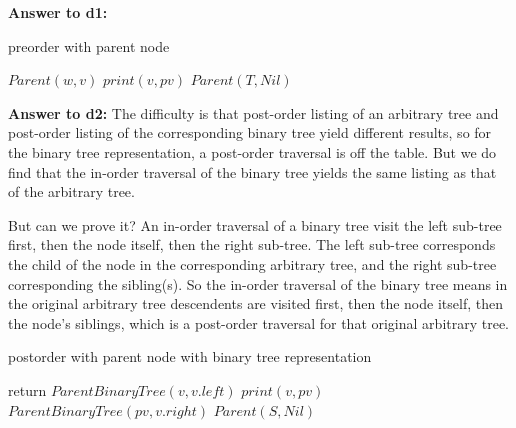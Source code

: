 \documentclass[a4paper,11pt]{article}
\theoremstyle{mytheor}
\begin{document}
\vspace{1.2in}

\noindent\textbf{Answer to d1:}
\begin{algorithm}[H]
\caption{preorder with parent node}\label{sec:TREEEVALUATION_2_19_D1}
\begin{algorithmic}[1]
    \State $Parent(w, v)$
  \EndFor
  $print(v, pv)$
\EndProcedure
\State
{}
  \State $Parent(T, Nil)$
\EndProcedure
\end{algorithmic}
\end{algorithm}

\vspace{1.2in}

\noindent\textbf{Answer to d2:} The difficulty is that post-order listing of an arbitrary tree and post-order listing of the corresponding binary tree yield different results, so for the binary tree representation, a post-order traversal is off the table. But we do find that the in-order traversal of the binary tree yields the same listing as that of the arbitrary tree.

But can we prove it? An in-order traversal of a binary tree visit the left sub-tree first, then the node itself, then the right sub-tree. The left sub-tree corresponds the child of the node in the corresponding arbitrary tree, and the right sub-tree corresponding the sibling(s). So the in-order traversal of the binary tree means in the original arbitrary tree descendents are visited first, then the node itself, then the node's siblings, which is a post-order traversal for that original arbitrary tree.

\begin{algorithm}[H]
\caption{postorder with parent node with binary tree representation}\label{sec:TREEEVALUATION_2_19_D2}
\begin{algorithmic}[1]
    \State return
  \Else
    \State $ParentBinaryTree(v, v.left)$ 
    \State $print(v, pv)$
    \State $ParentBinaryTree(pv, v.right)$ 
  \EndIf
\EndProcedure
\State
{}
  \State $Parent(S, Nil)$
\EndProcedure
\end{algorithmic}
\end{algorithm}

\vspace{1.2in}
\end{document}
